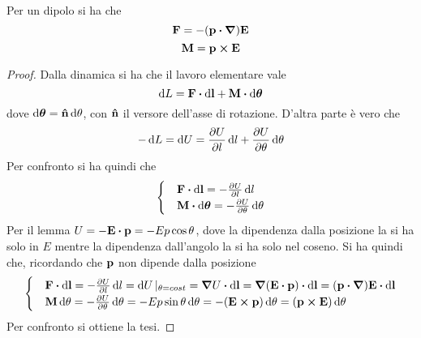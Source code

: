 \begin{thm}
    Per un dipolo si ha che
    \begin{equation}
        \vb{F}=-(\vb{p}\vdot\grad)\vb{E}
    \end{equation}
    \begin{equation}
        \vb{M}=\vb{p}\cp\vb{E}
    \end{equation}
\end{thm}
\begin{proof}
    Dalla dinamica si ha che il lavoro elementare vale
    \[
        \dd{L}=\vb{F}\vdot\dd{\vb{l}}+\vb{M}\vdot\dd{\vb*{\theta}}
    \]
    dove $\dd{\vb*{\theta}}=\vu{n}\dd{\theta}$, con $\vu{n}$ il versore dell'asse di rotazione.
    D'altra parte è vero che
    \[
        -\dd{L}=\dd{U}=\pdv{U}{l}\dd{l}+\pdv{U}{\theta}\dd{\theta}
    \]
    Per confronto si ha quindi che
    \[
        \begin{cases}
            & \vb{F}\vdot\dd{\vb{l}}=-\pdv{U}{l}\dd{l} \\
            & \vb{M}\vdot\dd{\vb*{\theta}}=-\pdv{U}{\theta}\dd{\theta}
        \end{cases}
    \]
    Per il lemma $U=-\vb{E}\vdot\vb{p}=-Ep\cos\theta$, dove la dipendenza dalla posizione la si ha
    solo in $E$ mentre la dipendenza dall'angolo la si ha solo nel coseno.
    Si ha quindi che, ricordando che $\vb{p}$ non dipende dalla posizione
    \[
        \begin{cases}
            & \vb{F}\vdot\dd{\vb{l}}=-\pdv{U}{l}\dd{l}=\dd{U}|_{\theta=cost}=\grad{U}\vdot\dd{\vb{l}}=
            \grad{(\vb{E}\vdot\vb{p})}\vdot\dd{\vb{l}}=(\vb{p}\vdot\grad)\vb{E}\vdot \dd{\vb{l}}\\
            & \vb{M}\dd{\vb{\theta}}=-\pdv{U}{\theta}\dd{\theta}=-Ep\sin\theta\dd{\theta}=
            -(\vb{E}\cp\vb{p})\dd{\vb{\theta}}=(\vb{p}\cp\vb{E})\dd{\vb{\theta}}
        \end{cases}
    \]
    Per confronto si ottiene la tesi.
\end{proof}
